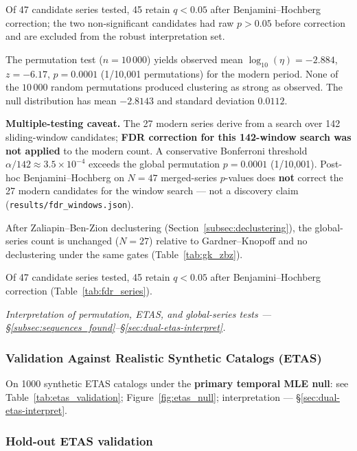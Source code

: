 \documentclass[draft]{agujournal2019}
\begin{document}
\noindent Of 47 candidate series tested, 45 retain $q < 0.05$ after
Benjamini--Hochberg correction; the two non-significant candidates had
raw $p > 0.05$ before correction and are excluded from the robust
interpretation set.
\label{subsec:significance}

The permutation test ($n = 10\,000$) yields observed mean $\log_{10}(\eta) = -2.884$,
$z = -6.17$, $p = 0.0001$ (1/10{,}001 permutations) for the modern period.
None of the $10\,000$ random permutations produced clustering as strong as observed.
The null distribution has mean $-2.8143$ and standard deviation $0.0112$.

\noindent\textbf{Multiple-testing caveat.}
The 27 modern series derive from a search over 142 sliding-window candidates;
\textbf{FDR correction for this 142-window search was not applied} to the modern count.
A conservative Bonferroni threshold $\alpha/142 \approx 3.5\times 10^{-4}$ exceeds
the global permutation $p=0.0001$ (1/10{,}001).
Post-hoc Benjamini--Hochberg on $N=47$ merged-series $p$-values does \textbf{not}
correct the 27 modern candidates for the window search --- not a discovery claim
(\texttt{results/fdr\_windows.json}).

After Zaliapin--Ben-Zion declustering (Section~\ref{subsec:declustering}),
the global-series count is unchanged ($N=27$) relative to Gardner--Knopoff
and no declustering under the same gates (Table~\ref{tab:gk_zbz}).

Of 47 candidate series tested, 45 retain $q < 0.05$ after
Benjamini--Hochberg correction (Table~\ref{tab:fdr_series}).

\noindent\textit{Interpretation of permutation, ETAS, and global-series tests
--- \S\ref{subsec:sequences_found}--\S\ref{sec:dual-etas-interpret}.}

\subsubsection{Validation Against Realistic Synthetic Catalogs (ETAS)}
\label{subsubsec:etas_results}

On 1000 synthetic ETAS catalogs under the \textbf{primary temporal MLE null}:
see Table~\ref{tab:etas_validation}; Figure~\ref{fig:etas_null};
interpretation --- \S\ref{sec:dual-etas-interpret}.

\subsubsection{Hold-out ETAS validation}
\label{subsubsec:etas_holdout}
\end{document}
